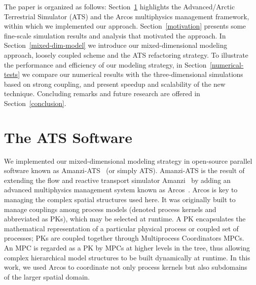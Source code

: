\documentclass[review]{elsarticle}
\begin{document}



The paper is organized as follows: Section~\ref{arcos-framework} highlights the Advanced/Arctic  Terrestrial Simulator (ATS) and the Arcos multiphysics management framework, within which we implemented our approach. Section~\ref{motivation} presents some fine-scale simulation results and analysis that motivated the approach.  In Section~\ref{mixed-dim-model} we introduce our mixed-dimensional modeling approach, loosely coupled scheme and the ATS refactoring strategy. To illustrate the performance and efficiency of our modeling strategy, in Section~\ref{numerical-tests} we compare our numerical results with the three-dimensional simulations based on strong coupling, and present speedup and scalability of the new technique. Concluding remarks and future research are offered in Section~\ref{conclusion}.

\section{The ATS Software}\label{arcos-framework}

We implemented our mixed-dimensional modeling strategy in open-source parallel software known as Amanzi-ATS~\cite{ref} (or simply ATS). Amanzi-ATS is the result of extending the flow and reactive transport  simulator Amanzi~\cite{moulton2012high} by adding an advanced multiphysics management system known as Arcos~\cite{ecoon2016managing}. Arcos is key to managing the complex spatial structures used here. It was originally built to manage couplings among process models (denoted process kernels and abbreviated as PKs), which may be selected at runtime. A PK encapsulates the mathematical representation of a particular physical process or coupled set of processes; PKs are coupled together through Multiprocess Coordinators MPCs. An MPC is regarded as a PK by MPCs at higher levels in the tree, thus allowing complex hierarchical model structures to be built dynamically at runtime. In this work, we used Arcos to coordinate not only process kernels but also subdomains of the larger spatial domain. 
\end{document}
